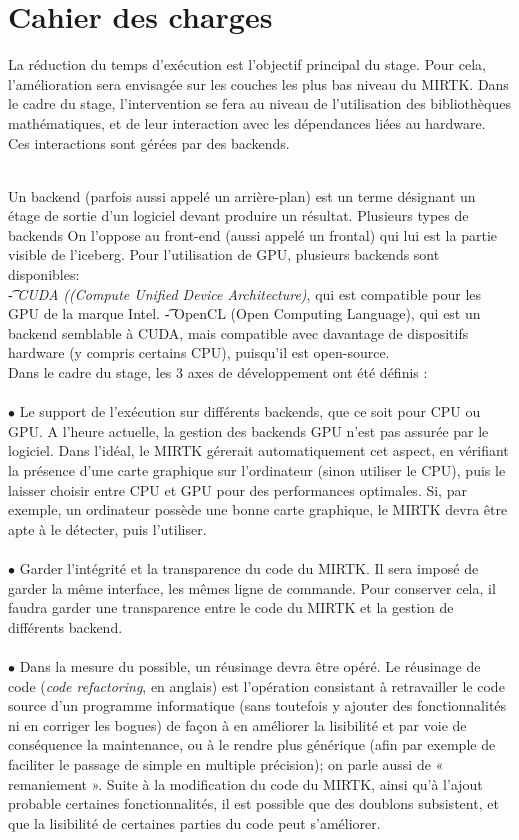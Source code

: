 \documentclass[10pt]{report}
\begin{document}
	\section{Cahier des charges}
	La réduction du temps d'exécution est l'objectif principal du stage. Pour cela, l'amélioration sera envisagée sur les couches les plus bas niveau du MIRTK. Dans le cadre du stage, l'intervention se fera au niveau de l'utilisation des bibliothèques mathématiques, et de leur interaction avec les dépendances liées au hardware. Ces interactions sont gérées par des backends.\\ ~\par
	
	Un backend (parfois aussi appelé un arrière-plan) est un terme désignant un étage de sortie d'un logiciel devant produire un résultat. Plusieurs types de backends On l'oppose au front-end (aussi appelé un frontal) qui lui est la partie visible de l'iceberg. Pour l'utilisation de GPU, plusieurs backends sont disponibles: \\
	\t- \textit{CUDA ((Compute Unified Device Architecture)}, qui est compatible pour les GPU de la marque Intel.
	\t- OpenCL (Open Computing Language), qui est un backend semblable à CUDA, mais compatible avec davantage de dispositifs hardware (y compris certains CPU), puisqu'il est open-source.\\
	
	Dans le cadre du stage, les 3 axes de développement ont été définis : \\
	\\{$\bullet$} Le support de l'exécution sur différents backends, que ce soit pour CPU ou GPU. A l'heure actuelle, la gestion des backends GPU n'est pas assurée par le logiciel. Dans l'idéal, le MIRTK gérerait automatiquement cet aspect, en vérifiant la présence d'une carte graphique sur l'ordinateur (sinon utiliser le CPU), puis le laisser choisir entre CPU et GPU pour des performances optimales. Si, par exemple, un ordinateur possède une bonne carte graphique, le MIRTK devra être apte à le détecter, puis l'utiliser.\\
	\\{$\bullet$} Garder l'intégrité et la transparence du code du MIRTK. Il sera imposé de garder la même interface, les mêmes ligne de commande. Pour conserver cela, il faudra garder une transparence entre le code du MIRTK et la gestion de différents backend. \\
	\\{$\bullet$} Dans la mesure du possible, un réusinage devra être opéré. Le réusinage de code (\textit{code refactoring}, en anglais) est l'opération consistant à retravailler le code source d'un programme informatique (sans toutefois y ajouter des fonctionnalités ni en corriger les bogues) de façon à en améliorer la lisibilité et par voie de conséquence la maintenance, ou à le rendre plus générique (afin par exemple de faciliter le passage de simple en multiple précision); on parle aussi de « remaniement ». Suite à la modification du code du MIRTK, ainsi qu'à l'ajout probable certaines fonctionnalités, il est possible que des doublons subsistent, et que la lisibilité de certaines parties du code peut s'améliorer.	
\end{document}
